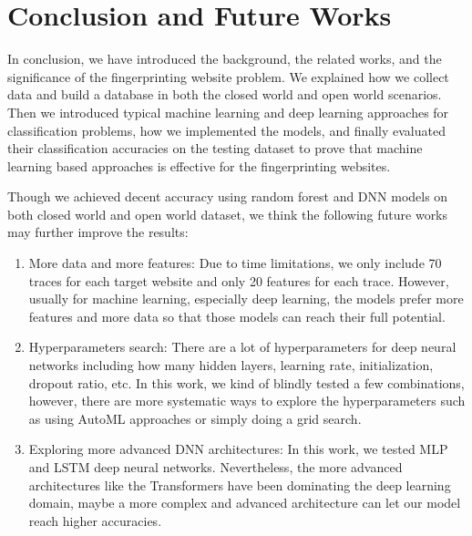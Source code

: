\documentclass[conference]{IEEEtran}
\begin{document}
\section{Conclusion and Future Works}
In conclusion, we have introduced the background, the related works, and the significance of the fingerprinting website problem. We explained how we collect data and build a database in both the closed world and open world scenarios. Then we introduced typical machine learning and deep learning approaches for classification problems, how we implemented the models, and finally evaluated their classification accuracies on the testing dataset to prove that machine learning based approaches is effective for the fingerprinting websites.

Though we achieved decent accuracy using random forest and DNN models on both closed world and open world dataset, we think the following future works may further improve the results:
\begin{enumerate}
    \item More data and more features: Due to time limitations, we only include 70 traces for each target website and only 20 features for each trace. However, usually for machine learning, especially deep learning, the models prefer more features and more data so that those models can reach their full potential.
    \item Hyperparameters search: There are a lot of hyperparameters for deep neural networks including how many hidden layers, learning rate, initialization, dropout ratio, etc. In this work, we kind of blindly tested a few combinations, however, there are more systematic ways to explore the hyperparameters such as using AutoML approaches or simply doing a grid search.
    \item Exploring more advanced DNN architectures: In this work, we tested MLP and LSTM deep neural networks. Nevertheless, the more advanced architectures like the Transformers\cite{b16} have been dominating the deep learning domain, maybe a more complex and advanced architecture can let our model reach higher accuracies.
\end{enumerate}
\end{document}
